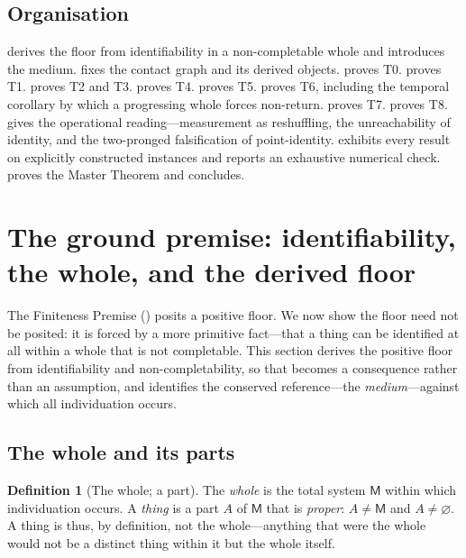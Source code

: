 \documentclass[11pt,a4paper]{article}
\theoremstyle{thmstyle}
\theoremstyle{definition}
\newtheorem{definition}[theorem]{Definition}
\theoremstyle{remark}
\newcommand{\med}{\mathsf{M}}             %
\begin{document}
\subsection{Organisation}

 derives the floor from identifiability in a non-completable
whole and introduces the medium.  fixes the contact graph and
its derived objects.  proves T0.  proves T1.
 proves T2 and T3.  proves T4.
 proves T5.  proves T6, including the temporal
corollary by which a progressing whole forces non-return. 
proves T7.  proves T8.  gives the
operational reading---measurement as reshuffling, the unreachability of identity,
and the two-pronged falsification of point-identity. 
exhibits every result on explicitly constructed instances and reports an
exhaustive numerical check.  proves the Master Theorem and
concludes.


\section{The ground premise: identifiability, the whole, and the derived floor}
\label{sec:ground}

The Finiteness Premise () posits a positive floor. We now show
the floor need not be posited: it is forced by a more primitive fact---that a
thing can be identified at all within a whole that is not completable. This
section derives the positive floor from identifiability and non-completability,
so that  becomes a consequence rather than an assumption, and
identifies the conserved reference---the \emph{medium}---against which all
individuation occurs.

\subsection{The whole and its parts}

\begin{definition}[The whole; a part]
\label{def:whole}
The \emph{whole} is the total system $\med$ within which individuation occurs.
A \emph{thing} is a part $A$ of $\med$ that is \emph{proper}: $A\neq\med$ and
$A\neq\varnothing$. A thing is thus, by definition, not the whole---anything that
were the whole would not be a distinct thing within it but the whole itself.
\end{definition}
\end{document}
